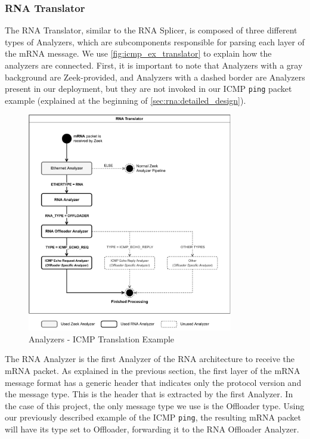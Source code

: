 \subsubsection*{RNA Translator}

The RNA Translator, similar to the RNA Splicer, is composed of three different types of Analyzers, which are subcomponents responsible for parsing each layer of the mRNA message. We use \autoref{fig:icmp_ex_translator} to explain how the analyzers are connected. First, it is important to note that Analyzers with a gray background are Zeek-provided, and Analyzers with a dashed border are Analyzers present in our deployment, but they are not invoked in our ICMP \texttt{ping} packet example (explained at the beginning of \autoref{sec:rna:detailed_design}).

\begin{figure}[ht]
    \caption{Analyzers - ICMP Translation Example}
    \begin{center}
        \includegraphics[width=0.8\textwidth]{images/icmp_ex_translator.pdf}  
    \end{center}
    \label{fig:icmp_ex_translator}
\end{figure}

\newpage{}

The RNA Analyzer is the first Analyzer of the RNA architecture to receive the mRNA packet. As explained in the previous section, the first layer of the mRNA message format has a generic header that indicates only the protocol version and the message type. This is the header that is extracted by the first Analyzer. In the case of this project, the only message type we use is the Offloader type\footnotemark{}. Using our previously described example of the ICMP \texttt{ping}, the resulting mRNA packet will have its type set to Offloader, forwarding it to the RNA Offloader Analyzer.

